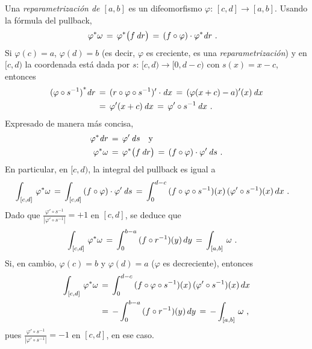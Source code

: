 Una \emph{reparametrizaci\'{o}n de $[a,b]$} es un difeomorfismo
$\varphi:\,[c,d]\rightarrow [a,b]$. Usando la f\'{o}rmula del pullback,
\begin{align*}
	{\varphi}^{*}\omega & \,=\,{\varphi}^{*}\big(f\,\mathit{d}_{}{r}\big)
		\,=\,(f\circ\varphi)\cdot{\varphi}^{*}\mathit{d}_{}{r}
	\text{ .}
\end{align*}
%
Si $\varphi(c)=a$, $\varphi(d)=b$ (es decir, $\varphi$ es creciente, es
una \emph{reparametrizaci\'{o}n}) y en $[c,d)$ la coordenada est\'{a}
dada por $s:\,[c,d)\rightarrow [0,d-c)$ con $s(x)=x-c$, entonces
\begin{align*}
	{(\varphi\circ s^{-1})}^{*}\mathit{d}_{}{r} & \,=\,
		(r\circ\varphi\circ s^{-1})'\cdot\mathit{d}_{}{x} \,=\,
		(\varphi(x+c)-a)'(x)\,\mathit{d}_{}{x} \\
	& \,=\,\varphi'(x+c)\,\mathit{d}_{}{x} \,=\,\varphi'\circ s^{-1}\,\mathit{d}_{}{x}
	\text{ .}
\end{align*}
%
Expresado de manera m\'{a}s concisa,
\begin{align*}
	{\varphi}^{*}\mathit{d}_{}{r} & \,=\,\varphi'\,\mathit{d}_{}{s}
	\quad\text{y} \\
	{\varphi}^{*}\omega & \,=\,{\varphi}^{*}\big(f\,\mathit{d}_{}{r}\big) \,=\,
		(f\circ\varphi)\cdot\varphi'\,\mathit{d}_{}{s}
	\text{ .}
\end{align*}
%
En particular, en $[c,d)$, la integral del pullback es igual a
\begin{align*}
	\int_{[c,d]}\,{\varphi}^{*}\omega & \,=\,
		\int_{[c,d]}\,(f\circ\varphi)\cdot\varphi'\,\mathit{d}_{}{s} \,=\,
		\int_{0}^{d-c}\,(f\circ\varphi\circ s^{-1})(x)\,
			(\varphi'\circ s^{-1})(x)\,dx
		\text{ .}
\end{align*}
%
Dado que $\frac{\varphi'\circ s^{-1}}{|\varphi'\circ s^{-1}|}=+1$ en
$[c,d]$, se deduce que
\begin{align*}
	\int_{[c,d]}\,{\varphi}^{*}\omega & \,=\,
		\int_{0}^{b-a}\,(f\circ r^{-1})(y)\,dy \,=\,
		\int_{[a,b]}\,\omega
	\text{ .}
\end{align*}
%
Si, en cambio, $\varphi(c)=b$ y $\varphi(d)=a$ ($\varphi$ es decreciente),
entonces
\begin{align*}
	\int_{[c,d]}\,{\varphi}^{*}\omega & \,=\,
		\int_{0}^{d-c}\,(f\circ\varphi\circ s^{-1})(x)\,
			(\varphi'\circ s^{-1})(x)\,dx \\
	& \,=\,-\int_{0}^{b-a}\,(f\circ r^{-1})(y)\,dy \,=\,
		-\int_{[a,b]}\,\omega
	\text{ ,}
\end{align*}
%
pues $\frac{\varphi'\circ s^{-1}}{|\varphi'\circ s^{-1}|}=-1$ en $[c,d]$,
en ese caso.

